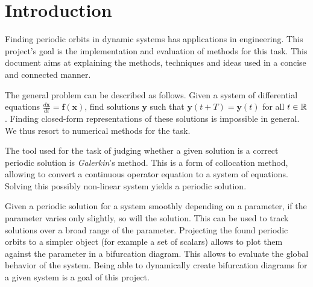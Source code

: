 \section{Introduction}


Finding periodic orbits in dynamic systems has applications in engineering. %
This project's goal is the implementation and evaluation of methods for this task.
This document aims at explaining the methods, techniques and ideas used in a concise and connected manner.

The general problem can be described as follows.
Given a system of differential equations $\frac{d \mathbf x}{dt} = \mathbf f(\mathbf x)$, find solutions $\mathbf y$ such that $\mathbf y(t+T) = \mathbf y(t)$ for all $t \in \mathbb{R}$.
Finding closed-form representations of these solutions is impossible in general.
We thus resort to numerical methods for the task.

The tool used for the task of judging whether a given solution is a correct periodic solution is \emph{Galerkin}'s method.
This is a form of collocation method, allowing to convert a continuous operator equation to a system of equations.
Solving this possibly non-linear system yields a periodic solution.

Given a periodic solution for a system smoothly depending on a parameter, if the parameter varies only slightly, so will the solution.
This can be used to track solutions over a broad range of the parameter.
Projecting the found periodic orbits to a simpler object (for example a set of scalars) allows to plot them against the parameter in a bifurcation diagram.
This allows to evaluate the global behavior of the system.
Being able to dynamically create bifurcation diagrams for a given system is a goal of this project.

